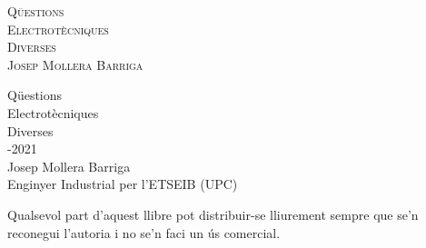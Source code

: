 \pagecolor{colorPortada}

\begin{titlepage}
  \parbox{18cm}{\fontsize{60pt}{60pt}\selectfont\color{red}\scshape%
                 Qüestions\\[25pt] Electrotècniques\\[25pt] Diverses\\[80pt]%
                \fontsize{40pt}{40pt}\selectfont{}Josep Mollera Barriga}
   \vspace*{10mm}
   \begin{center}
        \fontsize{10pt}{11pt}\selectfont
		
   \end{center}
\end{titlepage}

\pagecolor{white}

\cleardoublepage\thispagestyle{empty}

{\fontsize{60pt}{60pt}\selectfont%
Qüestions\\[25pt]
Electrotècniques\\[25pt]
Diverses\\[90pt]}
{\fontsize{40pt}{40pt}-2021 \hspace{5mm}{\Huge(versió 13.0)}\\[85pt]
Josep Mollera Barriga\\[25pt]}
{\fontsize{25pt}{25pt}\selectfont
Enginyer Industrial per l'ETSEIB (UPC)}
\vfill
{\fontsize{15pt}{20pt}\selectfont
\begin{list}{}
 {\setlength{\labelwidth}{7mm} \setlength{\leftmargin}{7mm}\setlength{\labelsep}{2mm}}
 \item[\faCopyright]  Qualsevol part d'aquest llibre  pot  distribuir-se lliurement  sempre que se’n reconegui l’autoria i no se’n faci un ús comercial.
\end{list}}

\cleardoublepage\thispagestyle{empty}

